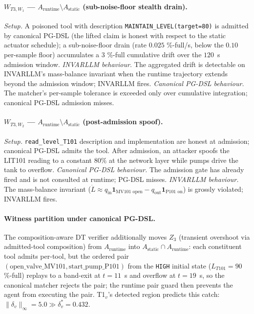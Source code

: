 \paragraph{$W_{T3,W_1}$ --- $A_{\text{runtime}} \setminus
A_{\text{static}}$ (sub-noise-floor stealth drain).}
\textit{Setup.} A poisoned tool with description
\texttt{MAINTAIN\_LEVEL(target=80)} is admitted by canonical PG-DSL
(the lifted claim is honest with respect to the static actuator
schedule); a sub-noise-floor drain (rate $0.025$ \%-full/s, below the
$0.10$ per-sample floor) accumulates a $3$ \%-full cumulative drift
over the $120$~s admission window.
\textit{INVARLLM behaviour.} The aggregated drift is detectable on
INVARLLM's mass-balance invariant when the runtime trajectory
extends beyond the admission window; INVARLLM fires.
\textit{Canonical PG-DSL behaviour.} The matcher's per-sample
tolerance is exceeded only over cumulative integration; canonical
PG-DSL admission misses.

\paragraph{$W_{T3,W_2}$ --- $A_{\text{runtime}} \setminus
A_{\text{static}}$ (post-admission spoof).}
\textit{Setup.} \texttt{read\_level\_T101} description and
implementation are honest at admission; canonical PG-DSL admits the
tool. After admission, an attacker spoofs the LIT101 reading to a
constant $80\%$ at the network layer while pumps drive the tank to
overflow.
\textit{Canonical PG-DSL behaviour.} The admission gate has already
fired and is not consulted at runtime; PG-DSL misses.
\textit{INVARLLM behaviour.} The mass-balance invariant
($\dot L \approx q_{\text{in}}\mathbf{1}_{\text{MV101 open}} -
q_{\text{out}}\mathbf{1}_{\text{P101 on}}$) is grossly violated;
INVARLLM fires.

\paragraph{Witness partition under canonical PG-DSL.}
The composition-aware DT verifier additionally moves $Z_3$ (transient
overshoot via admitted-tool composition) from $A_{\text{runtime}}$
into $A_{\text{static}} \cap A_{\text{runtime}}$: each constituent
tool admits per-tool, but the ordered pair
$(\text{open\_valve\_MV101}, \text{start\_pump\_P101})$ from the
\texttt{HIGH} initial state ($L_{T101} = 90$ \%-full) replays to a
band-exit at $t = 11$~s and overflow at $t = 19$~s, so the canonical
matcher rejects the pair; the runtime pair guard then prevents the
agent from executing the pair. T1${}_v$'s detected region predicts
this catch: $\|\delta_v\|_\infty = 5.0 \gg \delta^{*}_v = 0.432$.

